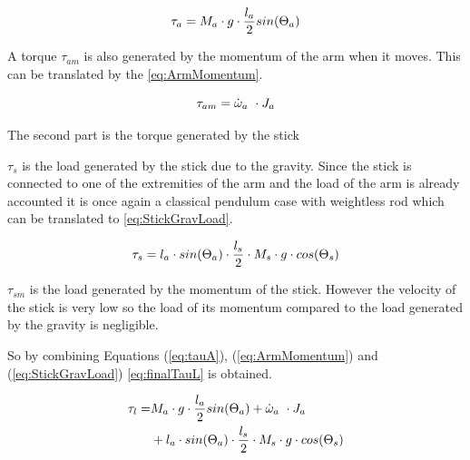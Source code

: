 \begin{equation}\label{eq:tauA}
	\tau_a=M_a\cdot g \cdot \frac{l_a}{2} sin(\Theta_a) \addunit{\newton\meter}
\end{equation}
\startexplain
{}
\stopexplain

A torque $\tau_{am}$ is also generated by the momentum of the arm when it moves. This can be translated by the \autoref{eq:ArmMomentum}.

\begin{equation}\label{eq:ArmMomentum}
	\tau_{am}=\dot\omega_a\ \cdot J_a \addunit{\newton\meter}
\end{equation}
\startexplain
{}
\stopexplain

The second part is the torque generated by the stick

$\tau_s$ is the load generated by the stick due to the gravity. Since the stick is connected to one of the extremities of the arm and the load of the arm is already accounted it is once again a classical pendulum case with weightless rod which can be translated to \autoref{eq:StickGravLoad}.

\begin{equation}\label{eq:StickGravLoad}
	\tau_s = l_a\cdot sin(\Theta_a) \cdot \frac{l_s}{2}\cdot M_s\cdot g\cdot cos(\Theta_s) \addunit{\newton\meter}
\end{equation}

$\tau_{sm}$ is the load generated by the momentum of the stick. However the velocity of the stick is very low so the load of its momentum compared to the load generated by the gravity is negligible. 

So by combining Equations (\ref{eq:tauA}), (\ref{eq:ArmMomentum}) and (\ref{eq:StickGravLoad}) \autoref{eq:finalTauL} is obtained.

\begin{equation}\label{eq:finalTauL}
	\begin{flalign}
	\tau_l=&M_a\cdot g \cdot \frac{l_a}{2} sin(\Theta_a)+\dot\omega_a\ \cdot J_a \\
	&+l_a\cdot sin(\Theta_a) \cdot \frac{l_s}{2}\cdot M_s\cdot g\cdot cos(\Theta_s) \addunit{\newton\meter}
	\end{flalign}
\end{equation}

